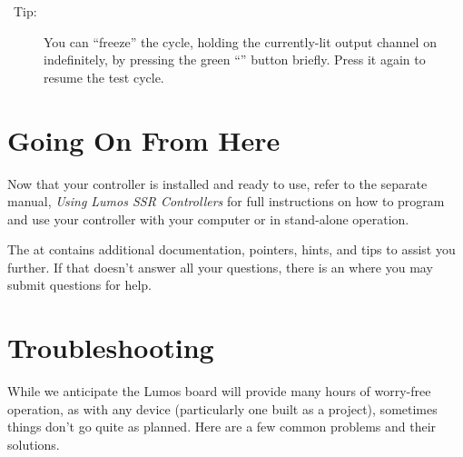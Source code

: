 \documentclass[letterpaper,twoside,onecolumn,openright,final]{memoir}
\begin{document}
\begin{description}
	\item[\HandRight\ Tip:]  You can ``freeze'' the cycle, holding the currently-lit
		output channel on indefinitely, by pressing the green ``'' button
		briefly.  Press it again to resume the test cycle.
\end{description}

\chapter{Going On From Here}
Now that your controller is installed and ready to use, refer to the separate manual,
\emph{Using Lumos SSR Controllers} for full instructions on how to program
and use your controller with your computer or in stand-alone operation.

The  at  contains additional documentation,
pointers, hints, and tips to assist you further.  If that doesn't answer all your questions,
there is an  where you may submit questions for help.

\backmatter
\appendix



\chapter{Troubleshooting}\label{ch:troubleshooting}
While we anticipate the Lumos board will provide many hours of worry-free operation,
as with any device (particularly one built as a  project), sometimes things don't go
quite as planned.  Here are a few common problems and their solutions.
\end{document}
